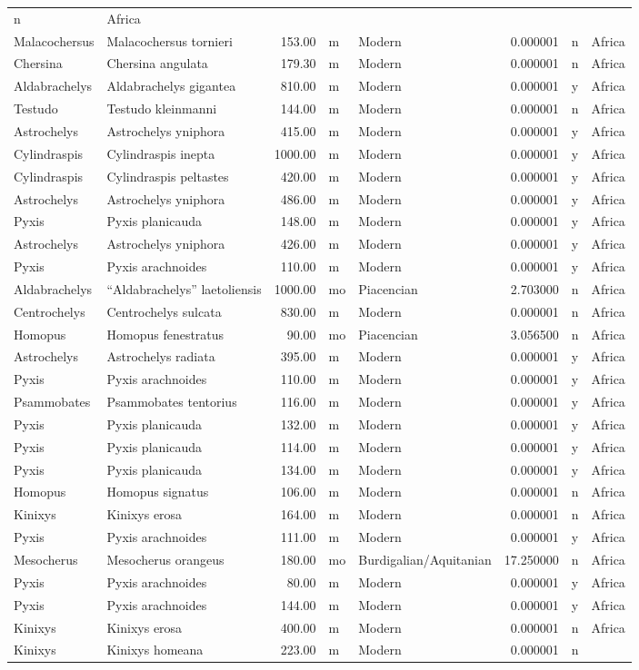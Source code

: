 \documentclass[]{article}
\begin{document}
\begin{longtable}[]{@{}llrllrll@{}}
n & Africa\tabularnewline
Malacochersus & Malacochersus tornieri & 153.00 & m & Modern & 0.000001
& n & Africa\tabularnewline
Chersina & Chersina angulata & 179.30 & m & Modern & 0.000001 & n &
Africa\tabularnewline
Aldabrachelys & Aldabrachelys gigantea & 810.00 & m & Modern & 0.000001
& y & Africa\tabularnewline
Testudo & Testudo kleinmanni & 144.00 & m & Modern & 0.000001 & n &
Africa\tabularnewline
Astrochelys & Astrochelys yniphora & 415.00 & m & Modern & 0.000001 & y
& Africa\tabularnewline
Cylindraspis & Cylindraspis inepta & 1000.00 & m & Modern & 0.000001 & y
& Africa\tabularnewline
Cylindraspis & Cylindraspis peltastes & 420.00 & m & Modern & 0.000001 &
y & Africa\tabularnewline
Astrochelys & Astrochelys yniphora & 486.00 & m & Modern & 0.000001 & y
& Africa\tabularnewline
Pyxis & Pyxis planicauda & 148.00 & m & Modern & 0.000001 & y &
Africa\tabularnewline
Astrochelys & Astrochelys yniphora & 426.00 & m & Modern & 0.000001 & y
& Africa\tabularnewline
Pyxis & Pyxis arachnoides & 110.00 & m & Modern & 0.000001 & y &
Africa\tabularnewline
Aldabrachelys & ``Aldabrachelys'' laetoliensis & 1000.00 & mo &
Piacencian & 2.703000 & n & Africa\tabularnewline
Centrochelys & Centrochelys sulcata & 830.00 & m & Modern & 0.000001 & n
& Africa\tabularnewline
Homopus & Homopus fenestratus & 90.00 & mo & Piacencian & 3.056500 & n &
Africa\tabularnewline
Astrochelys & Astrochelys radiata & 395.00 & m & Modern & 0.000001 & y &
Africa\tabularnewline
Pyxis & Pyxis arachnoides & 110.00 & m & Modern & 0.000001 & y &
Africa\tabularnewline
Psammobates & Psammobates tentorius & 116.00 & m & Modern & 0.000001 & y
& Africa\tabularnewline
Pyxis & Pyxis planicauda & 132.00 & m & Modern & 0.000001 & y &
Africa\tabularnewline
Pyxis & Pyxis planicauda & 114.00 & m & Modern & 0.000001 & y &
Africa\tabularnewline
Pyxis & Pyxis planicauda & 134.00 & m & Modern & 0.000001 & y &
Africa\tabularnewline
Homopus & Homopus signatus & 106.00 & m & Modern & 0.000001 & n &
Africa\tabularnewline
Kinixys & Kinixys erosa & 164.00 & m & Modern & 0.000001 & n &
Africa\tabularnewline
Pyxis & Pyxis arachnoides & 111.00 & m & Modern & 0.000001 & y &
Africa\tabularnewline
Mesocherus & Mesocherus orangeus & 180.00 & mo & Burdigalian/Aquitanian
& 17.250000 & n & Africa\tabularnewline
Pyxis & Pyxis arachnoides & 80.00 & m & Modern & 0.000001 & y &
Africa\tabularnewline
Pyxis & Pyxis arachnoides & 144.00 & m & Modern & 0.000001 & y &
Africa\tabularnewline
Kinixys & Kinixys erosa & 400.00 & m & Modern & 0.000001 & n &
Africa\tabularnewline
Kinixys & Kinixys homeana & 223.00 & m & Modern & 0.000001 & n &

\end{longtable}
\end{document}

